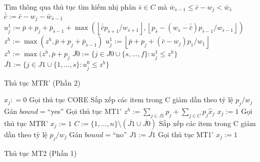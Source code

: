 \begin{algorithm}[H]
    {
        {
            Tìm thông qua thủ tục tìm kiếm nhị phân $\bar{s} \in C$ mà $\bar{w}_{\bar{s} - 1} \leq \bar{c} - w_j < \bar{w}_{\bar{s}}$\;
            $\bar{\bar{c}} := \bar{c} - w_j - \bar{w}_{\bar{s} - 1}$\;
            $u^1_j := \bar{p} + p_j + \bar{p}_{\bar{s} - 1} + \max(\left \lfloor \bar{\bar{c}}p_{\bar{s}+1}/w_{\bar{s} + 1}\right \rfloor, \left \lfloor p_{\bar{s}} - (w_{\bar{s}} - \bar{\bar{c}})p_{\bar{s}-1} / w_{\bar{s} - 1}\right \rfloor)$\;
            $z^h := \max(z^h, \bar{p} + p_j + \bar{p}_{\bar{s} - 1})$\;
        }
        \Else
        {
             $u^1_j := \left \lfloor \bar{p} + p_j + (\bar{c} - w_j)p_1 / w_1\right \rfloor$\;
            {
                $z^h := \max(z^h, \bar{p} + p_j$\;
            }
        }
    }
    $\overline{J0} := \{j \in J0 \cup \{s, \dots, f\}: u_j^1 \leq z^h\}$\;
    $\overline{J1} := \{j \in J1 \cup \{1, \dots, s\}: u_j^0 \leq z^h\}$\; 
    \caption{Thủ tục MTR' (Phần 2)}
    \label{algo:mtr_prime_part2}
\end{algorithm}


\begin{algorithm}[H]
    \DontPrintSemicolon
    \vspace{1em}
    \vspace{1em}
    {
        $x_j: = 0$\;
    }
    Gọi thủ tục CORE\;
    {
        Sắp xếp các item trong C giảm dần theo tỷ lệ $p_j / w_j$\;
        Gán $bound =$``yes''\;
        Gọi thủ tục MT1'\;
        $z^h := \sum_{j \in J1}p_j + \sum_{j \in C}p_j\hat{x}_j$\;
        {
            {
                $x_j := 1$\;
            }
        }
        \Else
        {
            Gọi thủ tục MTR'\;
            {
                {
                    $x_j := 1$\;
                }
            }
            \Else
            {
                $C:= \{1, \dots, n\} \setminus (\overline{J1} \cup \overline{J0})$\;
                Sắp xếp các item trong C giảm dần theo tỷ lệ $p_j / w_j$\;
                Gán $bound =$``no''\;
                $J1 := \overline{J1} $\;
                Gọi thủ tục MT1'
                {
                    $x_j := 1$\;
                }
            }
        }   
    }
    \caption{Thủ tục MT2 (Phần 1)}
    \label{algo:mt2_part1}
\end{algorithm}


